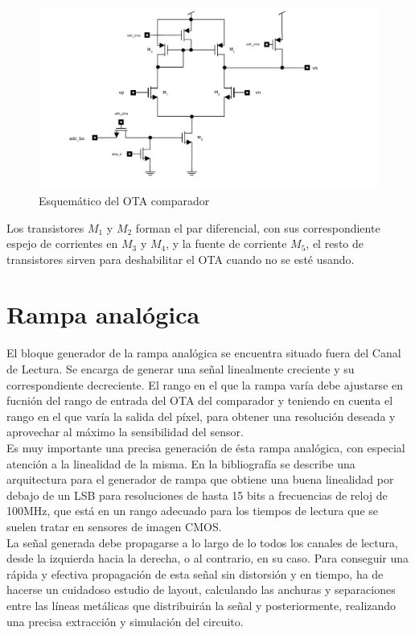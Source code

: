 \begin{figure}[h]
	\includegraphics[width=\textwidth]{svg/ota_sch.pdf}
	\caption{Esquemático del OTA comparador}
	\label{fig:ota_sch}
\end{figure}

Los transistores $M_1$ y $M_2$ forman el par diferencial, con sus correspondiente
espejo de corrientes en $M_3$ y $M_4$, y la fuente de corriente $M_5$, el resto de
transistores sirven para deshabilitar el OTA cuando no se esté usando.\\

\section{Rampa analógica}\label{cap:ro_sch_armp}

El bloque generador de la rampa analógica se encuentra situado fuera del Canal de
Lectura. Se encarga de generar una señal linealmente creciente y su correspondiente
decreciente. El rango en el que la rampa varía debe ajustarse en fucnión del rango
de entrada del OTA del comparador y teniendo en cuenta el rango en el que varía
la salida del píxel, para obtener una resolución deseada y aprovechar al máximo
la sensibilidad del sensor.\\

Es muy importante una precisa generación de ésta rampa analógica, con especial
atención a la linealidad de la misma. En la bibliografía se describe una arquitectura
para el generador de rampa que obtiene una buena linealidad por debajo de un LSB
para resoluciones de hasta 15 bits a frecuencias de reloj de 100MHz\cite{Sordo-Ibanez2013},
que está en un rango adecuado para los tiempos de lectura que se suelen tratar en
sensores de imagen CMOS.\\

La señal generada debe propagarse a lo largo de lo todos los canales de lectura,
desde la izquierda hacia la derecha, o al contrario, en su caso. Para conseguir
una rápida y efectiva propagación de esta señal sin distorsión y en tiempo, ha
de hacerse un cuidadoso estudio de layout, calculando las anchuras y separaciones
entre las líneas metálicas que distribuirán la señal y posteriormente, realizando
una precisa extracción y simulación del circuito.\\

